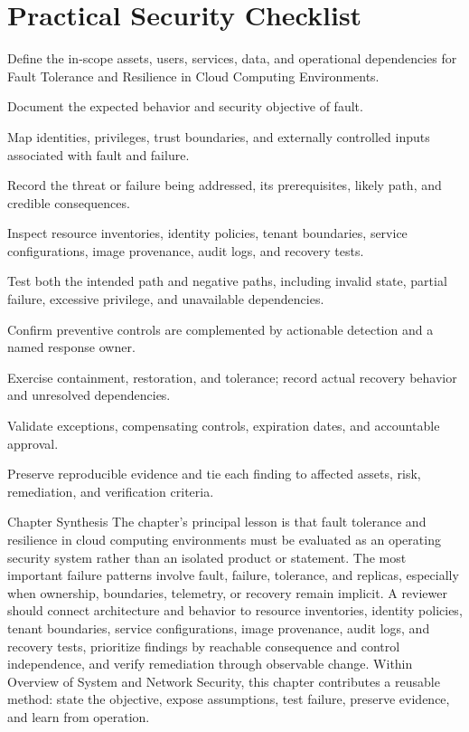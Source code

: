 \documentclass[11pt,letterpaper]{article}
\begin{document}
\section*{Practical Security Checklist}
\begin{CornellChecklist}
\item Define the in-scope assets, users, services, data, and operational dependencies for Fault Tolerance and Resilience in Cloud Computing Environments.
\item Document the expected behavior and security objective of fault.
\item Map identities, privileges, trust boundaries, and externally controlled inputs associated with fault and failure.
\item Record the threat or failure being addressed, its prerequisites, likely path, and credible consequences.
\item Inspect resource inventories, identity policies, tenant boundaries, service configurations, image provenance, audit logs, and recovery tests.
\item Test both the intended path and negative paths, including invalid state, partial failure, excessive privilege, and unavailable dependencies.
\item Confirm preventive controls are complemented by actionable detection and a named response owner.
\item Exercise containment, restoration, and tolerance; record actual recovery behavior and unresolved dependencies.
\item Validate exceptions, compensating controls, expiration dates, and accountable approval.
\item Preserve reproducible evidence and tie each finding to affected assets, risk, remediation, and verification criteria.
\end{CornellChecklist}
\begin{CornellSummaryBox}{Chapter Synthesis}
The chapter's principal lesson is that fault tolerance and resilience in cloud computing environments must be evaluated as an operating security system rather than an isolated product or statement. The most important failure patterns involve fault, failure, tolerance, and replicas, especially when ownership, boundaries, telemetry, or recovery remain implicit. A reviewer should connect architecture and behavior to resource inventories, identity policies, tenant boundaries, service configurations, image provenance, audit logs, and recovery tests, prioritize findings by reachable consequence and control independence, and verify remediation through observable change. Within Overview of System and Network Security, this chapter contributes a reusable method: state the objective, expose assumptions, test failure, preserve evidence, and learn from operation.
\end{CornellSummaryBox}
\end{document}
